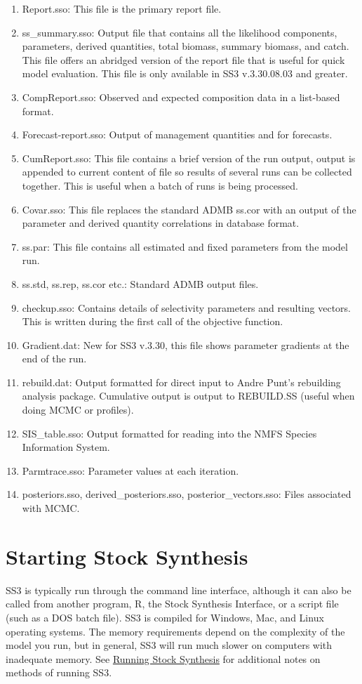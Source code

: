 \begin{enumerate}
		\item Report.sso: This file is the primary report file.
		\item ss\_summary.sso: Output file that contains all the likelihood components, parameters, derived quantities, total biomass, summary biomass, and catch. This file offers an abridged version of the report file that is useful for quick model evaluation. This file is only available in SS3 v.3.30.08.03 and greater.
		\item CompReport.sso: Observed and expected composition data in a list-based format.
		\item Forecast-report.sso: Output of management quantities and for forecasts.
		\item CumReport.sso: This file contains a brief version of the run output, output is appended to current content of file so results of several runs can be collected together. This is useful when a batch of runs is being processed.
		\item Covar.sso: This file replaces the standard ADMB ss.cor with an output of the parameter and derived quantity correlations in database format.
		\item ss.par: This file contains all estimated and fixed parameters from the model run. 
		\item ss.std, ss.rep, ss.cor etc.:  Standard ADMB output files.
		\item checkup.sso: Contains details of selectivity parameters and resulting vectors.  This is written during the first call of the objective function.
		\item Gradient.dat: New for SS3 v.3.30, this file shows parameter gradients at the end of the run.
		\item rebuild.dat: Output formatted for direct input to Andre Punt's rebuilding analysis package.  Cumulative output is output to REBUILD.SS (useful when doing MCMC or profiles).
		\item SIS\_table.sso: Output formatted for reading into the NMFS Species Information System.
		\item Parmtrace.sso: Parameter values at each iteration.
		\item posteriors.sso, derived\_posteriors.sso, posterior\_vectors.sso: Files associated with MCMC.
	\end{enumerate}

\pagebreak
		
\section[Starting Stock Synthesis]{Starting Stock Synthesis \protect\hyperref[sec:StartSS3]{\faExternalLink}}\label{sec:StartSS3}
SS3 is typically run through the command line interface, although it can also be called from another program, R, the Stock Synthesis Interface, or a script file (such as a DOS batch file). SS3 is compiled for Windows, Mac, and Linux operating systems. The memory requirements depend on the complexity of the model you run, but in general, SS3 will run much slower on computers with inadequate memory. See \hyperref[sec:RunningSS]{Running Stock Synthesis} for additional notes on methods of running SS3.

